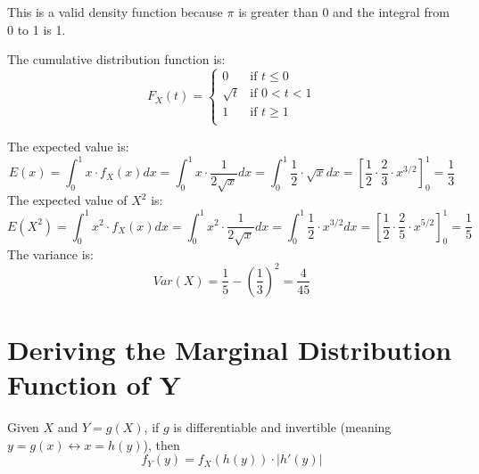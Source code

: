 This is a valid density function because $\pi$ is greater than 0 and the integral from 0 to 1 is 1. 

The cumulative distribution function is: 
\[
F_X(t) =
\begin{cases} 
0 & \text{if } t \leq 0 \\
\sqrt{t} & \text{if } 0 < t < 1 \\
1 & \text{if } t \geq 1 \\
\end{cases}
\]


The expected value is: 
\[
E(x) = \int_0^1 x \cdot f_X(x)dx = \int_0^1 x \cdot \frac{1}{2\sqrt{x}}dx = \int_0^1 \frac{1}{2} \cdot \sqrt{x}dx =[ \frac{1}{2} \cdot \frac{2}{3} \cdot x^{3/2}]_0^1 = \frac{1}{3}
\]
The expected value of $X^2$ is: 
\[
E(X^2) = \int_0^1 x^2 \cdot f_X(x)dx = \int_0^1 x^2 \cdot \frac{1}{2\sqrt{x}}dx = \int_0^1 \frac{1}{2} \cdot x^{3/2}dx = [\frac{1}{2} \cdot \frac{2}{5} \cdot x^{5/2}]_0^1 = \frac{1}{5}
\]
The variance is: 
\[
Var(X) = \frac{1}{5} - (\frac{1}{3})^2 = \frac{4}{45}
\]

\section{Deriving the Marginal Distribution Function of Y}

Given \(X\) and \(Y = g(X)\), if \(g\) is differentiable and invertible (meaning \(y = g(x) \leftrightarrow x = h(y)\)), then 
\[
f_Y(y) = f_X(h(y)) \cdot \left| h'(y) \right|
\]

